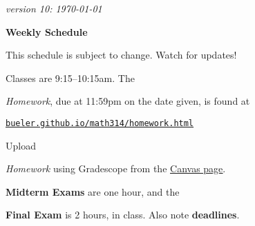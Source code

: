 \documentclass[12pt]{article}
\newcommand{\due}[1]{\strut {\color{BrickRed} \textsl{#1}}}
\newcommand{\ee}[1]{\strut {\color{Blue} \textbf{#1}}}
\newcommand{\dlinline}[1]{{\color{Purple} \textbf{#1}}}
\newcommand{\dl}[1]{{\small \dlinline{#1}}}
\begin{document}
\hfill \small \emph{version 10: \today} \normalsize

\bigskip\bigskip
\centerline{\Large \textbf{Weekly Schedule}}

\bigskip
This schedule is subject to change.  Watch for updates!

Classes are 9:15--10:15am.  The \due{Homework}, due at 11:59pm on the date given, is found at

 \quad \href{https://bueler.github.io/math314/homework.html}{\underline{\texttt{bueler.github.io/math314/homework.html}}}
 
Upload \due{Homework} using Gradescope from the \href{https://canvas.alaska.edu/courses/7017}{\underline{Canvas page}}.  \ee{Midterm Exams} are one hour, and the \ee{Final Exam} is 2 hours, in class.  Also note \dl{deadlines}.

\bigskip
\end{document}
